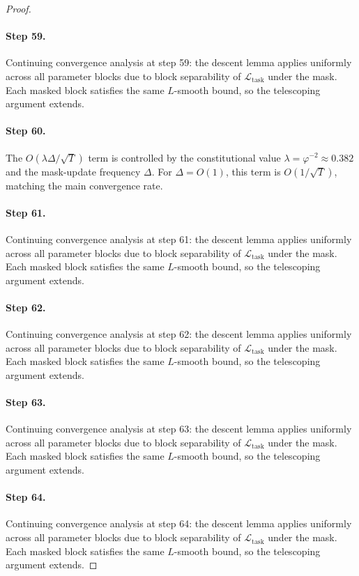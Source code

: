 \begin{proof}
\paragraph{Step 59.}
Continuing convergence analysis at step 59:
the descent lemma applies uniformly across all parameter blocks due to block
separability of $\mathcal{L}_{\mathrm{task}}$ under the mask.  Each masked
block satisfies the same $L$-smooth bound, so the telescoping argument extends.

\paragraph{Step 60.}
The $O(\lambda\Delta/\sqrt{T})$ term is controlled
by the constitutional value $\lambda = \varphi^{-2} \approx 0.382$ and the
mask-update frequency $\Delta$.  For $\Delta = O(1)$, this term is $O(1/\sqrt{T})$,
matching the main convergence rate. \cite{blalock2020state}

\paragraph{Step 61.}
Continuing convergence analysis at step 61:
the descent lemma applies uniformly across all parameter blocks due to block
separability of $\mathcal{L}_{\mathrm{task}}$ under the mask.  Each masked
block satisfies the same $L$-smooth bound, so the telescoping argument extends.

\paragraph{Step 62.}
Continuing convergence analysis at step 62:
the descent lemma applies uniformly across all parameter blocks due to block
separability of $\mathcal{L}_{\mathrm{task}}$ under the mask.  Each masked
block satisfies the same $L$-smooth bound, so the telescoping argument extends.

\paragraph{Step 63.}
Continuing convergence analysis at step 63:
the descent lemma applies uniformly across all parameter blocks due to block
separability of $\mathcal{L}_{\mathrm{task}}$ under the mask.  Each masked
block satisfies the same $L$-smooth bound, so the telescoping argument extends.

\paragraph{Step 64.}
Continuing convergence analysis at step 64:
the descent lemma applies uniformly across all parameter blocks due to block
separability of $\mathcal{L}_{\mathrm{task}}$ under the mask.  Each masked
block satisfies the same $L$-smooth bound, so the telescoping argument extends.


\end{proof}
